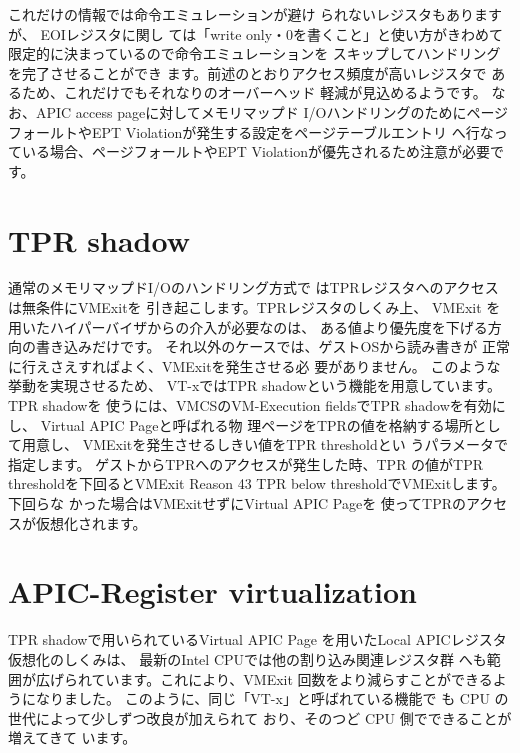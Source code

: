 \documentclass[a4j,12pt]{jarticle}
\begin{document}

 これだけの情報では命令エミュレーションが避け
られないレジスタもありますが、 EOIレジスタに関し
ては「write only・0を書くこと」と使い方がきわめて
限定的に決まっているので命令エミュレーションを
スキップしてハンドリングを完了させることができ
ます。前述のとおりアクセス頻度が高いレジスタで
あるため、これだけでもそれなりのオーバーヘッド
軽減が見込めるようです。
 なお、APIC access pageに対してメモリマップド
I/OハンドリングのためにページフォールトやEPT
Violationが発生する設定をページテーブルエントリ
へ行なっている場合、ページフォールトやEPT
Violationが優先されるため注意が必要です。

\section{TPR shadow}

 通常のメモリマップドI/Oのハンドリング方式で
はTPRレジスタへのアクセスは無条件にVMExitを
引き起こします。TPRレジスタのしくみ上、 VMExit
を用いたハイパーバイザからの介入が必要なのは、
ある値より優先度を下げる方向の書き込みだけです。
それ以外のケースでは、ゲストOSから読み書きが
正常に行えさえすればよく、VMExitを発生させる必
要がありません。
 このような挙動を実現させるため、 VT-xではTPR
shadowという機能を用意しています。 TPR shadowを
使うには、VMCSのVM-Execution fieldsでTPR
shadowを有効にし、 Virtual APIC Pageと呼ばれる物
理ページをTPRの値を格納する場所として用意し、
VMExitを発生させるしきい値をTPR thresholdとい
うパラメータで指定します。
 ゲストからTPRへのアクセスが発生した時、TPR
の値がTPR thresholdを下回るとVMExit Reason 43
TPR below thresholdでVMExitします。下回らな
かった場合はVMExitせずにVirtual APIC Pageを
使ってTPRのアクセスが仮想化されます。

\section{APIC-Register virtualization}

 TPR shadowで用いられているVirtual APIC Page
を用いたLocal APICレジスタ仮想化のしくみは、
最新のIntel CPUでは他の割り込み関連レジスタ群
へも範囲が広げられています。これにより、VMExit
回数をより減らすことができるようになりました。
 このように、同じ「VT-x」と呼ばれている機能で
も CPU の世代によって少しずつ改良が加えられて
おり、そのつど CPU 側でできることが増えてきて
います。
\end{document}
